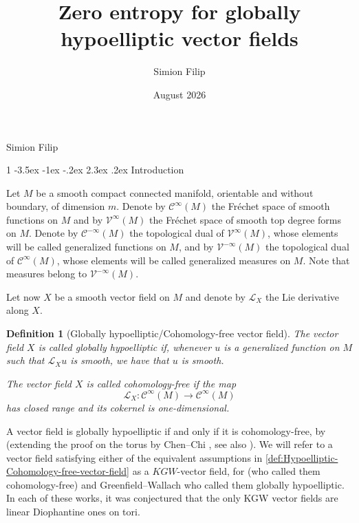 \documentclass[11pt]{amsart}
\title[Zero entropy for globally hypoelliptic vector fields]{Zero entropy for globally hypoelliptic vector fields}
\date{August 2026}
\author{
	Simion Filip
}
\makeatletter
\renewcommand{\section}
{\@startsection{section}
				   {1}
				   {\z@}%
                                   {-3.5ex \@plus -1ex \@minus -.2ex}%
                                   {2.3ex \@plus.2ex}%
                                   {\centering \normalfont \Large \bfseries \sffamily}}%
\newcommand \cC {\mathcal{C}}
\newcommand \cV {\mathcal{V}}
\newcommand \cL {\mathcal{L}}
\theoremstyle{mytheoremstyle}
\theoremstyle{mydefinitionstyle}
\theoremstyle{mytheoremstyle}
\numberwithin{equation}{section}
\theoremstyle{mydefinitionstyle}
\newtheorem{definition}[definition]{Definition}
\makeatother
\begin{document}
\begin{center}
{\large Simion Filip}
\end{center}
\section{Introduction}
	\label{sec:introduction}


Let $M$ be a smooth compact connected manifold, orientable and without boundary, of dimension $m$.
Denote by $\cC^\infty(M)$ the Fr\'echet space of smooth functions on $M$ and by $\cV^\infty(M)$ the Fr\'echet space of smooth top degree forms on $M$.
Denote by $\cC^{-\infty}(M)$ the topological dual of $\cV^\infty(M)$, whose elements will be called generalized functions on $M$, and by $\cV^{-\infty}(M)$ the topological dual of $\cC^\infty(M)$, whose elements will be called generalized measures on $M$.
Note that measures belong to $\cV^{-\infty}(M)$.

Let now $X$ be a smooth vector field on $M$ and denote by $\cL_X$ the Lie derivative along $X$.

\begin{definition}[Globally hypoelliptic/Cohomology-free vector field]
	\label{def:Hypoelliptic-Cohomology-free-vector-field}
	The vector field $X$ is called \emph{globally hypoelliptic} if, whenever $u$ is a generalized function on $M$ such that $\cL_Xu$ is smooth, we have that $u$ is smooth.

	The vector field $X$ is called \emph{cohomology-free} if the map
	\[
	\cL_X:\cC^\infty(M)\to\cC^\infty(M)
	\]
	has closed range and its cokernel is one-dimensional.
\end{definition}
A vector field is globally hypoelliptic if and only if it is cohomology-free, by \cite[Thm.~3.10]{Forni2008_On-the-Greenfield-Wallach-and-Katok-conjectures-in-dimension-three} (extending the proof on the torus by Chen--Chi \cite[Thm.~2.2]{ChenChi2000_Hypoelliptic-vector-fields-and-almost-periodic-motions-on-the-torus}, see also \cite[\S4]{Rodriguez-HertzRodriguez-Hertz2006_Cohomology-free-systems-and-the-first-Betti-number}).
We will refer to a vector field satisfying either of the equivalent assumptions in \autoref{def:Hypoelliptic-Cohomology-free-vector-field} as a $KGW$-vector field, for \cite[Conj.~3.6]{Katok2001_Cocycles-cohomology-and-combinatorial-constructions-in-ergodic-theory} (who called them cohomology-free) and Greenfield--Wallach \cite[Problem~2]{GreenfieldWallach1973_Globally-hypoelliptic-vector-fields} who called them globally hypoelliptic.
In each of these works, it was conjectured that the only KGW vector fields are linear Diophantine ones on tori.
\end{document}
